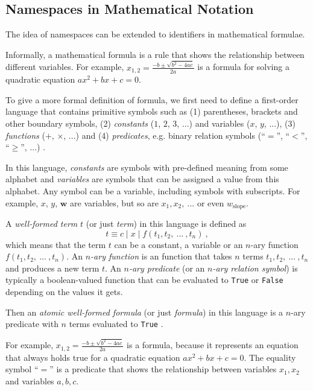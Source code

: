 

\subsection{Namespaces in Mathematical Notation}

The idea of namespaces can be extended to identifiers in mathematical 
formulae. 

Informally, a mathematical formula is a rule that shows the relationship
between different variables. For example,
$x_{1,2} = \frac{-b \pm \sqrt{b^2 - 4 a c}}{2 a}$ is a formula for solving
a quadratic equation $a x^2 + b x + c = 0$.


To give a more formal definition of formula, we first need to define
a first-order language that contains primitive symbols such as
(1) parentheses, brackets and other boundary symbols,
(2) \emph{constants} ($1$, $2$, $3$, ...) and variables ($x$, $y$, ...),
(3) \emph{functions} ($+$, $\times$, ...) and
(4) \emph{predicates}, e.g. binary relation symbols (``$=$'', ``$<$'', ``$\geqslant$'', ...)
\cite{barwise2000language}.

In this language, \emph{constants} are symbols with pre-defined meaning
from some alphabet and \emph{variables} are symbols that can be assigned
a value from this alphabet.
Any symbol can be a variable, including symbols with subscripts. For example,
$x$, $y$, $\mathbf w$ are variables, but so are $x_1, x_2, \ ...$ or even $w_\text{slope}$.

A \emph{well-formed term} $t$ (or just \emph{term}) in this language is defined as
$$t \equiv c \mid x \mid f(t_1, t_2, \ ... \ , t_n) \ ,$$ which means that the term
$t$ can be a constant, a variable or an $n$-ary function
$f(t_1, t_2, \ ... \ , t_n)$. An  \emph{$n$-ary function} is an
function that takes $n$ terms $t_1, t_2, \ ... \ , t_n$ and produces
a new term $t$. An \emph{$n$-ary predicate} (or an \emph{$n$-ary relation symbol})
is typically a boolean-valued function that can be evaluated to \texttt{True}
or \texttt{False} depending on the values it gets.

Then an \emph{atomic well-formed formula} (or just \emph{formula}) in this language
is a $n$-ary predicate with $n$ terms evaluated to \texttt{True} \cite{barwise2000language}.

For example, $x_{1,2} = \frac{-b \pm \sqrt{b^2 - 4 a c}}{2 a}$ is a formula,
because it represents an equation that always holds true for a quadratic equation
$a x^2 + b x + c = 0$. The equality symbol ``$=$'' is a predicate that shows
the relationship between variables $x_1, x_2$ and variables $a, b, c$.

